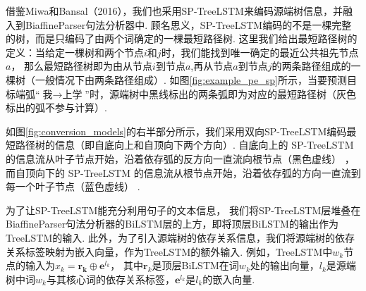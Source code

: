 借鉴Miwa和Bansal（2016）\cite{miwa-p16-treelstm-re}，我们也采用SP-TreeLSTM来编码源端树信息，并融入到BiaffineParser句法分析器中.
顾名思义，SP-TreeLSTM编码的不是一棵完整的树，而是只编码了由两个词确定的一棵最短路径树.
这里我们给出最短路径树的定义：当给定一棵树和两个节点$i$和$j$时，我们能找到唯一确定的最近公共祖先节点$a$，
那么最短路径树即为由从节点$i$到节点$a$,再从节点$a$到节点$j$的两条路径组成的一棵树（一般情况下由两条路径组成）.
如图\ref{fig:example_pe_sp}所示，当要预测目标端弧“$\mbox{我}\rightarrow \mbox{上学}$”时，源端树中黑线标出的两条弧即为对应的最短路径树（灰色标出的弧不参与计算）.

如图\ref{fig:conversion_models}的右半部分所示，我们采用双向SP-TreeLSTM编码最短路径树的信息（即自底向上和自顶向下两个方向）.
自底向上的 SP-TreeLSTM 的信息流从叶子节点开始，沿着依存弧的反方向一直流向根节点（黑色虚线） ，
而自顶向下的 SP-TreeLSTM 的信息流从根节点开始，沿着依存弧的方向一直流到每一个叶子节点（蓝色虚线） .

为了让SP-TreeLSTM能充分利用句子的文本信息，
我们将SP-TreeLSTM层堆叠在BiaffineParser句法分析器的BiLSTM层的上方，即将顶层BiLSTM的输出作为TreeLSTM的输入.
此外，为了引入源端树的依存关系信息，我们将源端树的依存关系标签映射为嵌入向量，作为TreeLSTM的额外输入.
例如，TreeLSTM中$w_k$节点的输入为$x_k=
    \mathbf{r_k} \oplus \mathbf{e}^{l_k}$，
其中$\mathbf{r}_k$是顶层BiLSTM在词$w_k$处的输出向量，$l_k$是源端树中词$w_k$与其核心词的依存关系标签，$\mathbf{e}^{l_k}$是$l_k$的嵌入向量.

